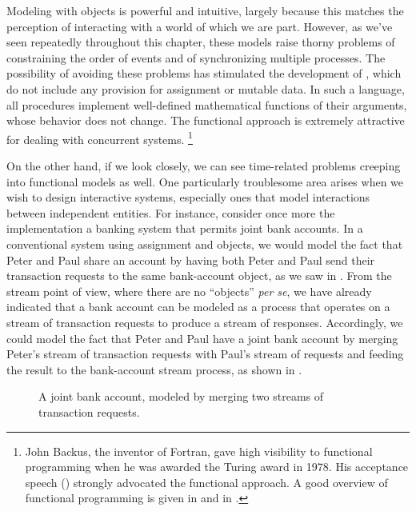 Modeling with objects is powerful and intuitive, largely because this matches the perception of interacting with a world of which we are part.
However, as we’ve seen repeatedly throughout this chapter, these models raise thorny problems of constraining the order of events and of synchronizing multiple processes.
The possibility of avoiding these problems has stimulated the development of , which do not include any provision for assignment or mutable data.
In such a language, all procedures implement well-defined mathematical functions of their arguments, whose behavior does not change.
The functional approach is extremely attractive for dealing with concurrent systems.%
\footnote{
	John Backus, the inventor of Fortran, gave high visibility to functional programming when he was awarded the  Turing award in 1978.
	His acceptance speech () strongly advocated the functional approach.
	A good overview of functional programming is given in  and in .
}

On the other hand, if we look closely, we can see time-related problems creeping into functional models as well.
One particularly troublesome area arises when we wish to design interactive systems, especially ones that model interactions between independent entities.
For instance, consider once more the implementation a banking system that permits joint bank accounts.
In a conventional system using assignment and objects, we would model the fact that Peter and Paul share an account by having both Peter and Paul send their transaction requests to the same bank-account object, as we saw in .
From the stream point of view, where there are no “objects” \emph{per se}, we have already indicated that a bank account can be modeled as a process that operates on a stream of transaction requests to produce a stream of responses.
Accordingly, we could model the fact that Peter and Paul have a joint bank account by merging Peter’s stream of transaction requests with Paul’s stream of requests and feeding the result to the bank-account stream process, as shown in .

\begin{figure}[tb]
	\centering
	
	\caption{
		A joint bank account, modeled by merging two streams of transaction requests.
	}
	\label{Figure 3.38}
\end{figure}


